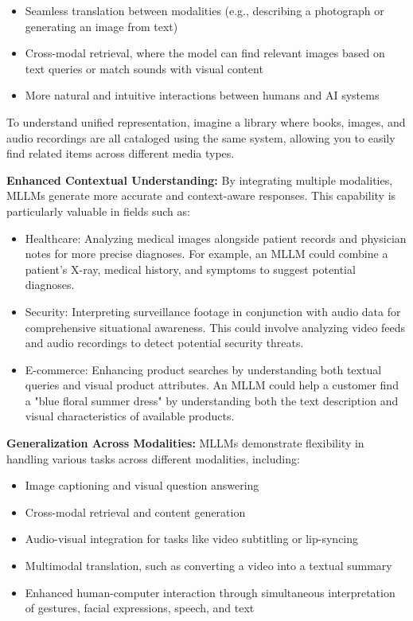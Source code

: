 \begin{itemize}
    \item Seamless translation between modalities (e.g., describing a photograph or generating an image from text)
    \item Cross-modal retrieval, where the model can find relevant images based on text queries or match sounds with visual content
    \item More natural and intuitive interactions between humans and AI systems
\end{itemize}

To understand unified representation, imagine a library where books, images, and audio recordings are all cataloged using the same system, allowing you to easily find related items across different media types.

\textbf{Enhanced Contextual Understanding:} By integrating multiple modalities, MLLMs generate more accurate and context-aware responses. This capability is particularly valuable in fields such as:

\begin{itemize}
    \item Healthcare: Analyzing medical images alongside patient records and physician notes for more precise diagnoses. For example, an MLLM could combine a patient's X-ray, medical history, and symptoms to suggest potential diagnoses.
    \item Security: Interpreting surveillance footage in conjunction with audio data for comprehensive situational awareness. This could involve analyzing video feeds and audio recordings to detect potential security threats.
    \item E-commerce: Enhancing product searches by understanding both textual queries and visual product attributes. An MLLM could help a customer find a "blue floral summer dress" by understanding both the text description and visual characteristics of available products.
\end{itemize}

\textbf{Generalization Across Modalities:} MLLMs demonstrate flexibility in handling various tasks across different modalities, including:

\begin{itemize}
    \item Image captioning and visual question answering
    \item Cross-modal retrieval and content generation
    \item Audio-visual integration for tasks like video subtitling or lip-syncing
    \item Multimodal translation, such as converting a video into a textual summary
    \item Enhanced human-computer interaction through simultaneous interpretation of gestures, facial expressions, speech, and text
\end{itemize}

